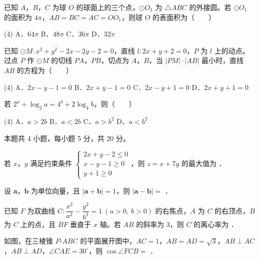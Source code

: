 已知 $A$，$B$，$C$ 为球 $O$ 的球面上的三个点，$\odot O_1$ 为 $\triangle ABC$ 的外接圆。若 $\odot O_1$ 的面积为 $4\pi$，$AB=BC=AC=OO_1$，则球 $O$ 的表面积为（　　）

\begin{gkopts}(4)
\task A．$64\pi$
\task B．$48\pi$
\task C．$36\pi$
\task D．$32\pi$
\end{gkopts}

已知 $\odot M:x^{2}+y^{2}-2x-2y-2=0$，直线 $l:2x+y+2=0$，$P$ 为 $l$ 上的动点。过点 $P$ 作 $\odot M$ 的切线 $PA$，$PB$，切点为 $A$，$B$，当 $|PM|\cdot|AB|$ 最小时，直线 $AB$ 的方程为（　　）

\begin{gkopts}(4)
\task A．$2x-y-1=0$
\task B．$2x+y-1=0$
\task C．$2x-y+1=0$
\task D．$2x+y+1=0$
\end{gkopts}

若 $2^{a}+\log_2 a=4^{b}+2\log_4 b$，则（　　）

\begin{gkopts}(4)
\task A．$a>2b$
\task B．$a<2b$
\task C．$a>b^{2}$
\task D．$a<b^{2}$
\end{gkopts}

\par\medskip


\begin{gktip}
本题共 4 小题，每小题 5 分，共 20 分。
\end{gktip}

若 $x$，$y$ 满足约束条件 $\begin{cases}2x+y-2\le0\\ x-y-1\ge0\\ y+1\ge0\end{cases}$，则 $z=x+7y$ 的最大值为 \gkblank{}．

设 $\boldsymbol a$，$\boldsymbol b$ 为单位向量，且 $|\boldsymbol a+\boldsymbol b|=1$，则 $|\boldsymbol a-\boldsymbol b|=$ \gkblank{}．

已知 $F$ 为双曲线 $C:\dfrac{x^{2}}{a^{2}}-\dfrac{y^{2}}{b^{2}}=1\ (a>0,\ b>0)$ 的右焦点，$A$ 为 $C$ 的右顶点，$B$ 为 $C$ 上的点，且 $BF$ 垂直于 $x$ 轴。若 $AB$ 的斜率为 $3$，则 $C$ 的离心率为 \gkblank{}．

如图，在三棱锥 $P\text{-}ABC$ 的平面展开图中，$AC=1$，$AB=AD=\sqrt3$，$AB\perp AC$，$AB\perp AD$，$\angle CAE=30^\circ$，则 $\cos\angle FCB=$ \gkblank{}．

\begin{center}\end{center}

